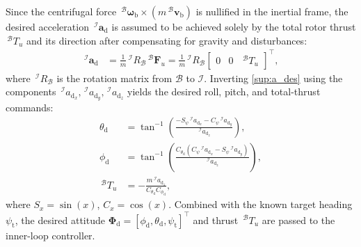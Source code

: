 \documentclass[10pt,journal]{IEEEtran}
\begin{document}
Since the centrifugal force $\,^\mathcal{B}\boldsymbol{\omega}_{\text{b}}\times(m\,^\mathcal{B}\boldsymbol{v}_{\text{b}})$ is nullified in the inertial frame, the desired acceleration $\,^\mathcal{I}\boldsymbol{a}_{\text{d}}$ is assumed to be achieved solely by the total rotor thrust $\,^\mathcal{B}T_u$ and its direction after compensating for gravity and disturbances:
\begin{align} \label{sup:a_des}
    \,^\mathcal{I}\boldsymbol{a}_{\text{d}} &= \frac{1}{m}\,^\mathcal{I}R_\mathcal{B}\,^\mathcal{B}\boldsymbol{F}_u = \frac{1}{m}\,^\mathcal{I}R_\mathcal{B}\begin{bmatrix} 0 & 0 & \,^\mathcal{B}T_u \end{bmatrix}^\top,
\end{align}
where $\,^\mathcal{I}R_\mathcal{B}$ is the rotation matrix from $\mathcal{B}$ to $\mathcal{I}$. Inverting \eqref{sup:a_des} using the components $\,^\mathcal{I}a_{\text{d}_x},\,^\mathcal{I}a_{\text{d}_y},\,^\mathcal{I}a_{\text{d}_z}$ yields the desired roll, pitch, and total-thrust commands:
\begin{align} \label{sup:euler_thrust_des}
    \theta_{\text{d}} &= \tan^{-1}\!\left(\tfrac{-S_\psi\,^\mathcal{I}a_{\text{d}_x} - C_\psi\,^\mathcal{I}a_{\text{d}_y}}{\,^\mathcal{I}a_{\text{d}_z}}\right), \nonumber \\
    \phi_{\text{d}} &= \tan^{-1}\!\left(\tfrac{C_{\theta_\text{d}}(C_\psi\,^\mathcal{I}a_{\text{d}_x} - S_\psi\,^\mathcal{I}a_{\text{d}_y})}{\,^\mathcal{I}a_{\text{d}_z}}\right), \nonumber \\
    \,^\mathcal{B}T_u &= -\tfrac{m\,^\mathcal{I}a_{\text{d}_z}}{C_{\theta_\text{d}}C_{\phi_\text{d}}},
\end{align}
where $S_x=\sin(x)$, $C_x=\cos(x)$. Combined with the known target heading $\psi_\text{t}$, the desired attitude $\boldsymbol{\Phi}_\text{d}=[\phi_\text{d},\theta_\text{d},\psi_\text{t}]^\top$ and thrust $\,^\mathcal{B}T_u$ are passed to the inner-loop controller.
\end{document}
